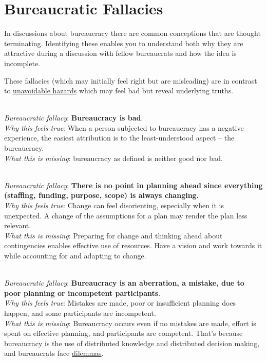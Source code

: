 \section{Bureaucratic Fallacies\label{sec:fallacies}}

In discussions about bureaucracy there are common conceptions that are \gls{thought terminating}. Identifying these enables you to understand both why they are attractive during a discussion with fellow bureaucrats and how the idea is incomplete.

These fallacies (which may initially feel right but are misleading) are in contrast to  \hyperref[sec:unavoidable-hazards]{unavoidable hazards}
which may feel bad but reveal underlying truths.

\ \\
\textit{Bureaucratic fallacy}: \textbf{Bureaucracy is bad}. \\
\textit{Why this feels true}: When a person subjected to bureaucracy has a negative experience, the easiest attribution is to the least-understood aspect -- the bureaucracy.\\
\textit{What this is missing}: \Gls{bureaucracy} as defined is neither good nor bad. 

\ \\
\textit{Bureaucratic fallacy}: 
\textbf{There is no point in planning ahead since everything (staffing, funding, purpose, scope) is always changing.}\\
\textit{Why this feels true}: Change can feel disorienting, especially when it is unexpected. A change of the assumptions for a plan may render the plan less relevant. \\
\textit{What this is missing}: Preparing for change and thinking ahead about contingencies enables effective use of resources. Have a vision and work towards it while accounting for and adapting to change. 


\ \\
\textit{Bureaucratic fallacy}: \textbf{Bureaucracy is an aberration, a mistake, due to poor planning or incompetent participants}. \\
\textit{Why this feels true}: Mistakes are made, poor or insufficient planning does happen, and some participants are incompetent.\\
\textit{What this is missing}: Bureaucracy occurs even if no mistakes are made, effort is spent on effective planning, and participants are competent. That's because bureaucracy is the use of distributed knowledge and distributed decision making, and bureaucrats face \hyperref[sec:dilemma-trilemma]{dilemmas}.

